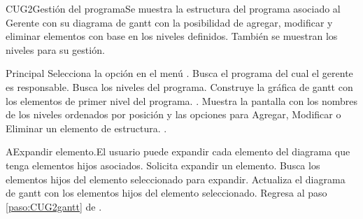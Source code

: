 
	\begin{UseCase}{CUG2}{Gestión del programa}{Se muestra la estructura del programa asociado al Gerente con su diagrama de gantt con la posibilidad de agregar, modificar y eliminar elementos con base en los niveles definidos. También se muestran los niveles para su gestión.}
	\end{UseCase}

	\begin{UCtrayectoria}{Principal}
		\UCpaso[\UCactor] Selecciona la opción  en el menú .
		\UCpaso Busca el programa del cual el gerente es responsable.
		\UCpaso Busca los niveles del programa.
		\UCpaso Construye la gráfica de gantt con los elementos de primer nivel del programa.    \label{paso:CUG2gantt}.
		\UCpaso Muestra la pantalla  con los nombres de los niveles ordenados por posición y las opciones para Agregar, Modificar o Eliminar un elemento de estructura.   \label{paso:CUG2niveles}.
	\end{UCtrayectoria}

	\begin{UCtrayectoriaA}{A}{Expandir elemento.}{El usuario puede expandir cada elemento del diagrama que tenga elementos hijos asociados.}
			\UCpaso[\UCactor] Solicita expandir un elemento.
			\UCpaso Busca los elementos hijos del elemento seleccionado para expandir.
			\UCpaso Actualiza el diagrama de gantt con los elementos hijos del elemento seleccionado.
			\UCpaso Regresa al paso \ref{paso:CUG2gantt} de .
	\end{UCtrayectoriaA}


